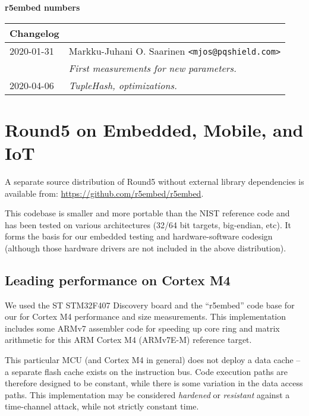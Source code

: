 \documentclass[a4paper]{article}
\begin{document}
\begin{center}
    {\large {\bf r5embed numbers \pdfdate}}

\vspace{3ex}
\begin{tabular}{l p{90mm}}
{\bf Changelog} \\
\hline
2020-01-31  & Markku-Juhani O. Saarinen \verb|<mjos@pqshield.com>| \\
            & {\it First measurements for new parameters.}  \\
2020-04-06  & {\it TupleHash, optimizations.}   \\
\hline
\end{tabular}
\end{center}


\section{Round5 on Embedded, Mobile, and IoT}

A separate source distribution of Round5 without external library
dependencies is available from: \url{https://github.com/r5embed/r5embed}.

This codebase is smaller and more portable than the NIST reference code and
has been tested on various architectures (32/64 bit targets, big-endian, etc).
It forms the basis for our embedded testing and hardware-software codesign
(although those hardware drivers are not included in the above distribution).

\subsection{Leading performance on Cortex M4}

We used the ST STM32F407 Discovery board and the ``r5embed'' code base for our
for Cortex M4 performance and size measurements. This implementation
includes some ARMv7 assembler code for speeding up core ring and matrix
arithmetic for this ARM Cortex M4 (ARMv7E-M) reference target.

This particular MCU (and Cortex M4 in general) does not deploy a data cache --
a separate flash cache exists on the instruction bus. Code execution paths are
therefore designed to be constant, while there is some variation in the data
access paths. This implementation may be considered \emph{hardened} or
\emph{resistant} against a time-channel attack, while not strictly constant
time.
\end{document}
